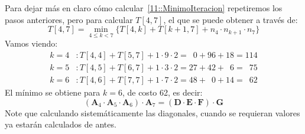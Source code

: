 \begin{ejemplo}
    Para dejar más en claro cómo calcular~\eqref{11::MinimoIteracion}
    repetiremos los pasos anteriores,
    pero para calcular \(T[4, 7]\),
    el que se puede obtener a través de:
    \begin{equation*}
      T[4, 7]
	= \min_{4 \le k < 7} \{ T[4, k] + T[k + 1, 7]
		      + n_4 \cdot n_{k + 1} \cdot n_7 \}
    \end{equation*}
    Vamos viendo:
    \begin{align*}
      k = 4 &\colon
	T[4, 4] + T[5, 7] + 1 \cdot 9 \cdot 2
	      = \phantom{0}0 + 96 + 18
	      = 114 \\
      k = 5 &\colon
	T[4, 5] + T[6, 7] + 1 \cdot 3 \cdot 2
	      = 27 + 42 + \phantom{0}6
	      = \phantom{0}75 \\
      k = 6 &\colon
	T[4, 6] + T[7, 7] + 1 \cdot 7 \cdot 2
	      = 48 + \phantom{0}0 + 14
	      = \phantom{0}62
    \end{align*}
    El mínimo se obtiene para \(k = 6\),
    de costo \num{62},
    es decir:
    \begin{equation}
      (\mathbf{A}_4 \cdot \mathbf{A}_5 \cdot \mathbf{A}_6) \cdot \mathbf{A}_7
	= (\mathbf{D} \cdot \mathbf{E} \cdot \mathbf{F}) \cdot \mathbf{G}
    \end{equation}
    Note que calculando sistemáticamente las diagonales,
    cuando se requieran valores ya estarán calculados de antes.


\end{ejemplo}
